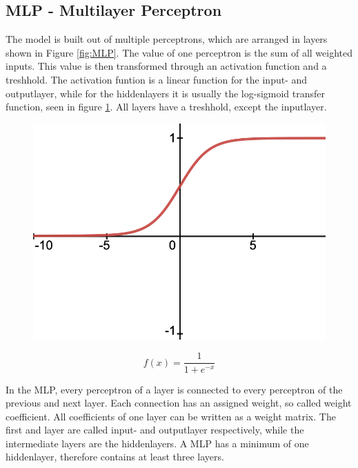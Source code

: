 \documentclass[11pt]{scrartcl}
\begin{document}
	\subsection{MLP - Multilayer Perceptron}
	
	The model is built out of multiple perceptrons, which are arranged in layers shown in Figure \ref{fig:MLP}. The value of one perceptron is the sum of all weighted inputs. This value is then transformed through an activation function and a treshhold. The activation funtion is a linear function for the input- and outputlayer, while for the hiddenlayers it is usually the log-sigmoid transfer function, seen in figure \ref{fig:log-sigmoid function}. All layers have a treshhold, except the inputlayer. 
	
	\begin{figure}[H]
	\centering
	\begin{minipage}{.5\textwidth}
	  \centering
	  \includegraphics[width=0.75\linewidth]{figures/log-sigmoid.png}
	\end{minipage}%
	\begin{minipage}{.5\textwidth}
	  \centering
		\begin{equation*}
			f(x) = \frac{1}{1 +e^{-x}}
		\end{equation*}
	\end{minipage}
	\label{fig:log-sigmoid function}
	\end{figure}
	
	In the MLP, every perceptron of a layer is connected to every perceptron of the previous and next layer. Each connection has an assigned weight, so called weight coefficient. All coefficients of one layer can be written as a weight matrix. The first and layer are called input- and outputlayer respectively, while the intermediate layers are the hiddenlayers. A MLP has a minimum of one hiddenlayer, therefore contains at least three layers.
	
\end{document}
